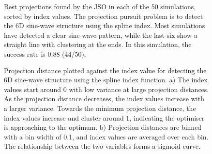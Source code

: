 \documentclass[
  number,
  preprint,
  3p]{elsarticle}
\begin{document}
\begin{figure}


\caption{\label{fig-projection}Best projections found by the JSO in each
of the 50 simulations, sorted by index values. The projection pursuit
problem is to detect the 6D sine-wave structure using the spline index.
Most simulations have detected a clear sine-wave pattern, while the last
six show a straight line with clustering at the ends. In this
simulation, the success rate is 0.88 (44/50).}

\end{figure}%

\begin{figure}


\caption{\label{fig-index-value-proj-dist}Projection distance plotted
against the index value for detecting the 6D sine-wave structure using
the spline index function. a) The index values start around 0 with low
variance at large projection distances. As the projection distance
decreases, the index values increase with a larger variance. Towards the
minimum projection distance, the index values increase and cluster
around 1, indicating the optimiser is approaching to the optimum. b)
Projection distances are binned with a bin width of 0.1, and index
values are averaged over each bin. The relationship between the two
variables forms a sigmoid curve.}

\end{figure}%
\end{document}
